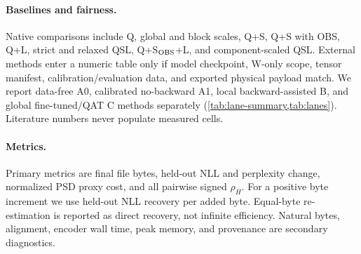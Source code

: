\paragraph{Baselines and fairness.}
Native comparisons include Q, global and block scales, Q+S, Q+S with OBS,
Q+L, strict and relaxed QSL, Q+S$_{\rm OBS}$+L, and component-scaled QSL.
External methods enter a numeric table only if model checkpoint, W-only scope,
tensor manifest, calibration/evaluation data, and exported physical payload
match.  We report data-free A0, calibrated no-backward A1, local
backward-assisted B, and global fine-tuned/QAT C methods separately
(\cref{tab:lane-summary,tab:lanes}).  Literature numbers never populate
measured cells.

\paragraph{Metrics.}
Primary metrics are final file bytes, held-out NLL and perplexity change,
normalized PSD proxy cost, and all pairwise signed $\rho_H$.  For a positive
byte increment we use held-out NLL recovery per added byte.  Equal-byte
re-estimation is reported as direct recovery, not infinite efficiency.
Natural bytes, alignment, encoder wall time, peak memory, and provenance are
secondary diagnostics.

